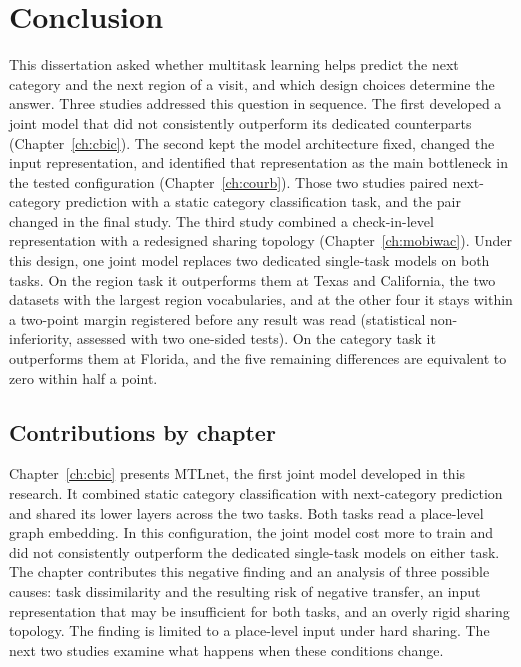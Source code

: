 

\chapter{Conclusion}
\label{ch:conclusion}

This dissertation asked whether multitask learning helps predict the next category and
the next region of a visit, and which design choices determine the answer. Three studies
addressed this question in sequence. The first developed a joint model that did not
consistently outperform its dedicated counterparts (Chapter~\ref{ch:cbic}). The second
kept the model architecture fixed, changed the input representation, and identified that
representation as the main bottleneck in the tested configuration
(Chapter~\ref{ch:courb}). Those two studies paired next-category prediction with a static
category classification task, and the pair changed in the final study.
The third study combined a check-in-level representation with a redesigned sharing
topology (Chapter~\ref{ch:mobiwac}). Under this design, one joint model replaces two
dedicated single-task models on both tasks. On the region task it outperforms
them at Texas and California, the two datasets with the largest region vocabularies, and at
the other four it stays within a two-point margin registered before any result was read
(statistical non-inferiority, assessed with two one-sided tests). On the category task it
outperforms them at Florida, and the five remaining differences are equivalent to zero within
half a point.


\section{Contributions by chapter}
\label{sec:conc:contributions}

Chapter~\ref{ch:cbic} presents MTLnet, the first joint model developed in this research.
It combined static category classification with next-category prediction and shared its
lower layers across the two tasks. Both tasks read a place-level graph embedding. In
this configuration, the joint model cost more to train and did not consistently
outperform the dedicated single-task models on either task. The chapter contributes
this negative finding and an analysis of three possible causes: task dissimilarity and
the resulting risk of negative transfer, an input representation that may be
insufficient for both tasks, and an overly rigid sharing topology. The finding is
limited to a place-level input under hard sharing. The next two studies examine what
happens when these conditions change.

